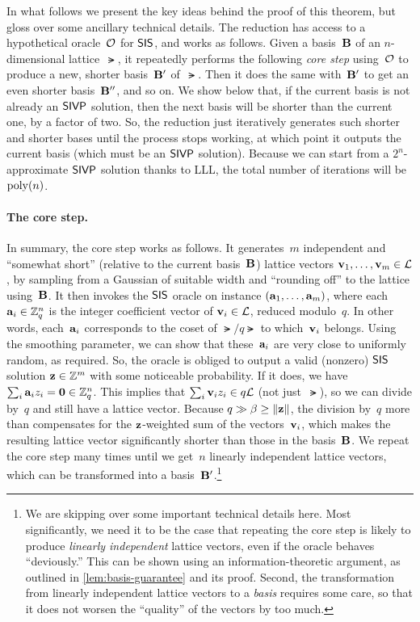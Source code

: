 \documentclass[11pt]{article}
\begin{document}
In what follows we present the key ideas behind the proof of this
theorem, but gloss over some ancillary technical details. The
reduction has access to a hypothetical oracle~$\mathcal{O}$ for $\mathsf{SIS}$, and
works as follows. Given a basis~$\mathbf{B}$ of an $n$-dimensional
lattice~$\lat$, it repeatedly performs the following \emph{core step}
using~$\mathcal{O}$ to produce a new, shorter basis~$\mathbf{B}'$ of~$\lat$. Then
it does the same with~$\mathbf{B}'$ to get an even shorter basis~$\mathbf{B}''$,
and so on. We show below that, if the current basis is not already an
$\mathsf{SIVP}$ solution, then the next basis will be shorter than the current
one, by a factor of two. So, the reduction just iteratively generates
such shorter and shorter bases until the process stops working, at
which point it outputs the current basis (which must be an $\mathsf{SIVP}$
solution). Because we can start from a $2^{n}$-approximate $\mathsf{SIVP}$
solution thanks to LLL, the total number of iterations will be
$\operatorname{poly}(n)$.

\paragraph{The core step.}

In summary, the core step works as follows. It generates~$m$
independent and ``somewhat short'' (relative to the current
basis~$\mathbf{B}$) lattice vectors
$\mathbf{v}_{1}, \ldots, \mathbf{v}_{m} \in \mathcal{L}$, by sampling from a Gaussian
of suitable width and ``rounding off'' to the lattice using~$\mathbf{B}$.
It then invokes the $\mathsf{SIS}$ oracle on instance
$(\mathbf{a}_{1}, \ldots, \mathbf{a}_{m})$, where each~$\mathbf{a}_{i} \in \mathbb{Z}_q^{n}$
is the integer coefficient vector of $\mathbf{v}_{i} \in \mathcal{L}$, reduced
modulo~$q$. In other words, each~$\mathbf{a}_{i}$ corresponds to the coset
of $\lat/q\lat$ to which~$\mathbf{v}_{i}$ belongs. Using the smoothing
parameter, we can show that these~$\mathbf{a}_{i}$ are very close to
uniformly random, as required. So, the oracle is obliged to output a
valid (nonzero) $\mathsf{SIS}$ solution $\mathbf{z} \in \mathbb{Z}^{m}$ with some
noticeable probability. If it does, we have
$\sum_{i} \mathbf{a}_{i} z_{i} = \mathbf{0} \in \mathbb{Z}_q^{n}$. This implies that
$\sum_{i} \mathbf{v}_{i} z_{i} \in q\mathcal{L}$ (not just~$\lat$), so we can
divide by~$q$ and still have a lattice vector. Because
$q \gg \beta \geq \lVert\mathbf{z}\rVert$, the division by~$q$ more than
compensates for the $\mathbf{z}$-weighted sum of the vectors~$\mathbf{v}_{i}$,
which makes the resulting lattice vector significantly shorter than
those in the basis~$\mathbf{B}$. We repeat the core step many times until
we get~$n$ linearly independent lattice vectors, which can be
transformed into a basis~$\mathbf{B}'$.\footnote{We are skipping over some
  important technical details here. Most significantly, we need it to
  be the case that repeating the core step is likely to produce
  \emph{linearly independent} lattice vectors, even if the oracle
  behaves ``deviously.'' This can be shown using an
  information-theoretic argument, as outlined in
  \cref{lem:basis-guarantee} and its proof. Second, the transformation
  from linearly independent lattice vectors to a \emph{basis} requires
  some care, so that it does not worsen the ``quality'' of the vectors
  by too much.}
\end{document}
